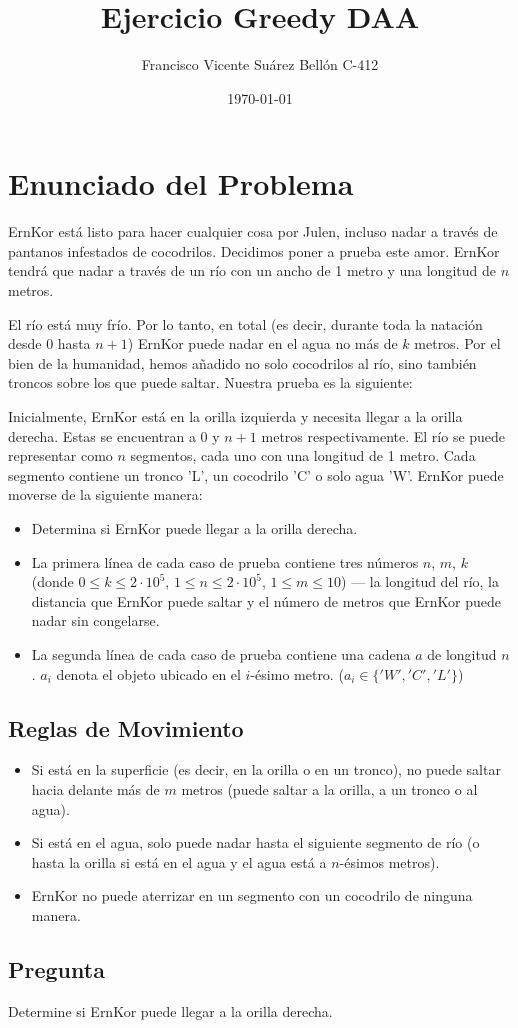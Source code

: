 \documentclass{article}
\title{Ejercicio Greedy DAA}
\author{Francisco Vicente Suárez Bellón C-412}
\date{\today}
\begin{document}
\maketitle

\section{Enunciado del Problema}

ErnKor está listo para hacer cualquier cosa por Julen, incluso nadar a través de pantanos infestados de cocodrilos. Decidimos poner a prueba este amor. ErnKor tendrá que nadar a través de un río con un ancho de 1 metro y una longitud de \(n\) metros.

El río está muy frío. Por lo tanto, en total (es decir, durante toda la natación desde 0 hasta \(n+1\)) ErnKor puede nadar en el agua no más de \(k\) metros. Por el bien de la humanidad, hemos añadido no solo cocodrilos al río, sino también troncos sobre los que puede saltar. Nuestra prueba es la siguiente:

Inicialmente, ErnKor está en la orilla izquierda y necesita llegar a la orilla derecha. Estas se encuentran a 0 y \(n+1\) metros respectivamente. El río se puede representar como \(n\) segmentos, cada uno con una longitud de 1 metro. Cada segmento contiene un tronco 'L', un cocodrilo 'C' o solo agua 'W'. ErnKor puede moverse de la siguiente manera:

\begin{itemize}
    \item Determina si ErnKor puede llegar a la orilla derecha.
    \item La primera línea de cada caso de prueba contiene tres números \(n\), \(m\), \(k\) (donde \(0 \leq k \leq 2 \cdot 10^5\), \(1 \leq n \leq 2 \cdot 10^5\), \(1 \leq m \leq 10\)) — la longitud del río, la distancia que ErnKor puede saltar y el número de metros que ErnKor puede nadar sin congelarse.
    \item La segunda línea de cada caso de prueba contiene una cadena \(a\) de longitud \(n\). \(a_i\) denota el objeto ubicado en el \(i\)-ésimo metro. (\(a_i \in \{ 'W', 'C', 'L' \}\))
\end{itemize}

\subsection{Reglas de Movimiento}
\begin{itemize}
    \item Si está en la superficie (es decir, en la orilla o en un tronco), no puede saltar hacia delante más de \(m\) metros (puede saltar a la orilla, a un tronco o al agua).
    \item Si está en el agua, solo puede nadar hasta el siguiente segmento de río (o hasta la orilla si está en el agua y el agua está a \(n\)-ésimos metros).
    \item ErnKor no puede aterrizar en un segmento con un cocodrilo de ninguna manera.
\end{itemize}

\subsection{Pregunta}
Determine si ErnKor puede llegar a la orilla derecha.
\end{document}
